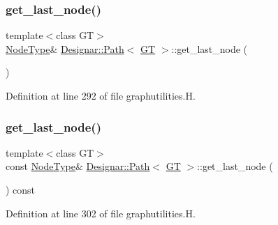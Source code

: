 \subsubsection{\texorpdfstring{get\+\_\+last\+\_\+node()}{get\_last\_node()}\hspace{0.1cm}{\footnotesize\ttfamily [1/2]}}
{\footnotesize\ttfamily template$<$class GT$>$ \\
\hyperlink{class_designar_1_1_path_a7b499fd50e96e3360968d4cfef7a3736}{Node\+Type}\& \hyperlink{class_designar_1_1_path}{Designar\+::\+Path}$<$ \hyperlink{demo-buildgraph_8_c_a3001c40d2c31ca87ed96cd7d1334a55e}{GT} $>$\+::get\+\_\+last\+\_\+node (\begin{DoxyParamCaption}{ }\end{DoxyParamCaption})\hspace{0.3cm}{\ttfamily [inline]}}



Definition at line 292 of file graphutilities.\+H.

\mbox{\label{class_designar_1_1_path_a4e80971589c8317a2e7f11c642ad2e19}} 
\subsubsection{\texorpdfstring{get\+\_\+last\+\_\+node()}{get\_last\_node()}\hspace{0.1cm}{\footnotesize\ttfamily [2/2]}}
{\footnotesize\ttfamily template$<$class GT$>$ \\
const \hyperlink{class_designar_1_1_path_a7b499fd50e96e3360968d4cfef7a3736}{Node\+Type}\& \hyperlink{class_designar_1_1_path}{Designar\+::\+Path}$<$ \hyperlink{demo-buildgraph_8_c_a3001c40d2c31ca87ed96cd7d1334a55e}{GT} $>$\+::get\+\_\+last\+\_\+node (\begin{DoxyParamCaption}{ }\end{DoxyParamCaption}) const\hspace{0.3cm}{\ttfamily [inline]}}



Definition at line 302 of file graphutilities.\+H.

\mbox{\label{class_designar_1_1_path_aed6cd565cad808bd6d08f0485e89077d}} 
